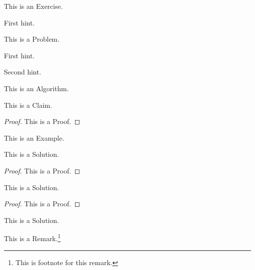 \documentclass[12pt]{scrartcl}
\begin{document}
\begin{exercise}
[Name]
This is an Exercise.
\end{exercise}
\begin{hints}
  \begin{hint}
    First hint.
  \end{hint}
\end{hints}

\begin{problem}
[Name]
This is a Problem.
\end{problem}
\begin{hints}
  \begin{hint}
    First hint.
  \end{hint}
  \begin{hint}
    Second hint.
  \end{hint}
\end{hints}

\begin{algorithm}
[Name]
This is an Algorithm.
\end{algorithm}

\begin{claim}
[Name]
This is a Claim.
\end{claim}

\begin{proof}
This is a Proof.
\end{proof}

\begin{example}
[Name]
This is an Example.
\end{example}

\begin{soln}
This is a Solution.
\end{soln}

\hrulebar

\begin{proof}
This is a Proof.
\end{proof}

\begin{soln}
This is a Solution.
\end{soln}

\begin{proof}
This is a Proof.
\end{proof}

\begin{soln}
This is a Solution.
\end{soln}

\begin{remark}
[Name]
  This is a Remark.\footnote{This is footnote for this remark.}
\end{remark}
\end{document}
